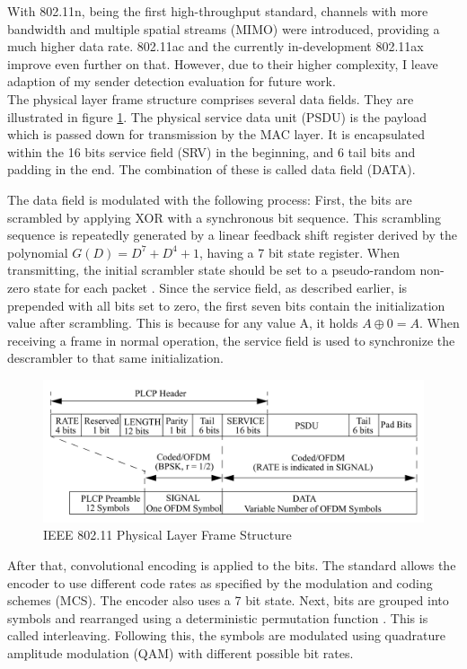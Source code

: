 With 802.11n, being the first high-throughput standard, channels with more bandwidth and multiple spatial streams (MIMO) were introduced, providing a much higher data rate. 802.11ac and the currently in-development 802.11ax improve even further on that. However, due to their higher complexity, I leave adaption of my sender detection evaluation for future work.\\

The physical layer frame structure comprises several data fields. They are illustrated in figure \ref{fig:phy-format}. The physical service data unit (PSDU) is the payload which is passed down for transmission by the MAC layer. It is encapsulated within the 16 bits service field (SRV) in the beginning, and 6 tail bits and padding in the end. The combination of these is called data field (DATA).

The data field is modulated with the following process: First, the bits are scrambled by applying XOR with a synchronous bit sequence. This scrambling sequence is repeatedly generated by a linear feedback shift register derived by the polynomial $G(D)=D^7+D^4+1$, having a 7 bit state register. When transmitting, the initial scrambler state should be set to a pseudo-random non-zero state for each packet \cite{ieee2012}. Since the service field, as described earlier, is prepended with all bits set to zero, the first seven bits contain the initialization value after scrambling. This is because for any value A, it holds $A \oplus 0 = A$. When receiving a frame in normal operation, the service field is used to synchronize the descrambler to that same initialization.

\begin{figure}[H]
	\centering
	\includegraphics[width=\textwidth]{gfx/images/phy-format}
	\caption[IEEE 802.11 Physical Layer Frame Structure]{IEEE 802.11 Physical Layer Frame Structure \cite{ieee2012}}
	\label{fig:phy-format}
\end{figure}

After that, convolutional encoding is applied to the bits. The standard allows the encoder to use different code rates as specified by the modulation and coding schemes (MCS). The encoder also uses a 7 bit state. Next, bits are grouped into symbols and rearranged using a deterministic permutation function \cite{perahia2013}. This is called interleaving. Following this, the symbols are modulated using quadrature amplitude modulation (QAM)	with different possible bit rates.\\

